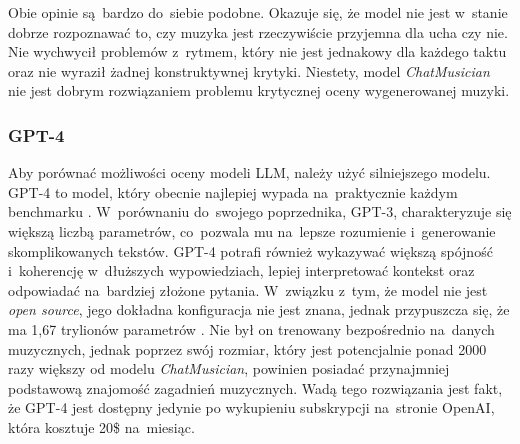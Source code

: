 \documentclass[data-science]{agh-wi} %
\begin{document}
Obie opinie są~bardzo do~siebie podobne. Okazuje się, że model nie jest w~stanie dobrze rozpoznawać to, czy muzyka jest rzeczywiście przyjemna dla ucha czy nie. Nie wychwycił problemów z~rytmem, który nie jest jednakowy dla każdego taktu oraz nie wyraził żadnej konstruktywnej krytyki. Niestety, model \textit{ChatMusician} nie jest dobrym rozwiązaniem problemu krytycznej oceny wygenerowanej muzyki.

\subsubsection*{GPT-4}
Aby porównać możliwości oceny modeli LLM, należy użyć silniejszego modelu. GPT-4 to model, który obecnie najlepiej wypada na~praktycznie każdym benchmarku \cite{openai2024gpt4}. W~porównaniu do~swojego poprzednika, GPT-3, charakteryzuje się większą liczbą parametrów, co~pozwala mu na~lepsze rozumienie i~generowanie skomplikowanych tekstów. GPT-4 potrafi również wykazywać większą spójność i~koherencję w~dłuższych wypowiedziach, lepiej interpretować kontekst oraz odpowiadać na~bardziej złożone pytania. W~związku z~tym, że model nie jest \textit{open source}, jego dokładna konfiguracja nie jest znana, jednak przypuszcza się, że ma 1,67 trylionów parametrów \cite{leakgpt4}. Nie był on trenowany bezpośrednio na~danych muzycznych, jednak poprzez swój rozmiar, który jest potencjalnie ponad 2000 razy większy od modelu \textit{ChatMusician}, powinien posiadać przynajmniej podstawową znajomość zagadnień muzycznych. Wadą tego rozwiązania jest fakt, że GPT-4 jest dostępny jedynie po wykupieniu subskrypcji na~stronie OpenAI, która kosztuje 20\$ na~miesiąc.
\end{document}
